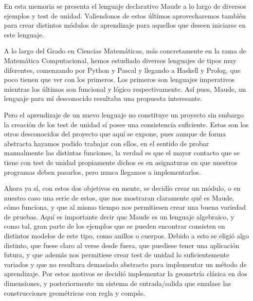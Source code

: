 
En esta memoria se presenta el lenguaje declarativo Maude a lo largo de diversos ejemplos y test de unidad. Valiendonos de estos últimos aprovecharemos también para crear distintos módulos de aprendizaje para aquellos que deseen iniciarse en este lenguaje.\par

A lo largo del Grado en Ciencias Matemáticas, más concretamente en la rama de Matemática Computacional, hemos estudiado diversos lenguajes de tipos muy diferentes, comenzando por Python y Pascal y llegando a Haskell y Prolog, que poco tienen que ver con los primeros. Los primeros son lenguajes imperativos mientras los últimos son funcional y lógico respectivamente. Así pues, Maude, un lenguaje para mí desconocido resultaba una propuesta interesante.\par

Pero el aprendizaje de un nuevo lenguaje no constituye un proyecto sin embargo la creación de los test de unidad sí posee una consistencia suficiente. Estos son los otros desconocidos del proyecto que aquí se expone, pues aunque de forma abstracta hayamos podido trabajar con ellos, en el sentido de probar manualmente las distintas funciones, la verdad es que el mayor contacto que se tiene con test de unidad propiamente dichos es en asignaturas en que nuestros programas deben pasarlos, pero nunca llegamos a implementarlos. \par

Ahora ya sí, con estos dos objetivos en mente, se decidío crear un módulo, o en nuestro caso una serie de estos, que nos mostraran claramente qué es Maude, cómo funciona, y que al mismo tiempo nos permitiesen crear una buena variedad de pruebas. Aquí es importante decir que Maude es un lenguaje algebraico, y como tal, gran parte de los ejemplos que se pueden encontrar consisten en distintos modelos de este tipo, como anillos o cuerpos. Debido a esto se eligió algo distinto, que fuese claro al verse desde fuera, que puediese tener una aplicación futura, y que además nos permitiese crear test de unidad lo suficientemente variados y que no resultara demasiado abstracto para implementar un método de aprendizaje. Por estos motivos se decidió implementar la geometría clásica en dos dimensiones, y posteriormente un sistema de entrada/salida que emulase las construcciones geométricas con regla y compás. \par

